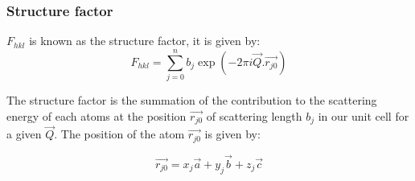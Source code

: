 \subsubsection{Structure factor}
$F_{hkl}$ is known as the structure factor, it is given by:
\begin{equation}
    \label{eq:StrucFactor}
    F_{hkl} = \sum_{j=0}^n b_j \exp{(-2\pi i \vec{Q}. \vec{r_{j0}})}
\end{equation}

The structure factor is the summation of the contribution to the scattering energy of each atoms at the position $\vec{r_{j0}}$ of scattering length $b_j$ in our unit cell for a given $\vec{Q}$.
The position of the atom $\vec{r_{j0}}$ is given by:

\begin{equation}
    \label{eq:AtomPos}
    \vec{r_{j0}} = x_j\vec{a} + y_j\vec{b} + z_j\vec{c}
\end{equation}
